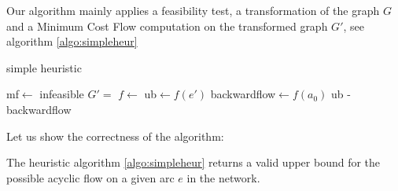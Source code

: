 Our algorithm mainly applies a feasibility test, a transformation of the graph $G$ and a Minimum Cost Flow computation 
on the transformed graph $G'$, see algorithm \ref{algo:simpleheur}

\begin{algorithm}
 \caption{simple heuristic}
 \label{algo:simpleheur}
 \begin{algorithmic}
  \State mf$\gets$ 
    \State\Return infeasible
  \EndIf
  \State $G'=$ 
  \State $f\gets$ 
  \State ub$\gets f(e')$
  \State backwardflow$\gets f(a_0)$
  \State \Return ub - backwardflow
  \EndFunction
 \end{algorithmic}
\end{algorithm}

Let us show the correctness of the algorithm: %

\begin{prop}
 The heuristic algorithm \ref{algo:simpleheur} returns a valid upper bound for the possible acyclic flow on a given 
  arc $e$ in the network.
\end{prop}

